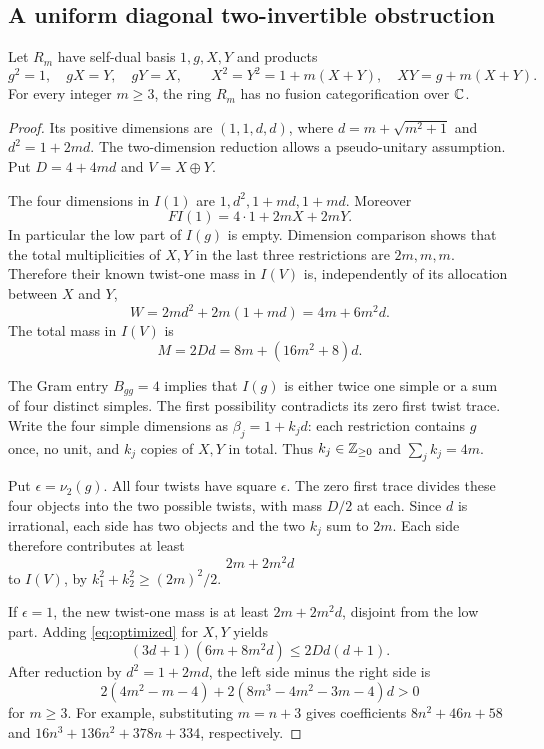 \subsection{A uniform diagonal two-invertible obstruction}
\begin{theorem}\label{thm:diagonal}
Let $R_m$ have self-dual basis $1,g,X,Y$ and products
\[
g^2=1,\quad gX=Y,\quad gY=X,\qquad
X^2=Y^2=1+m(X+Y),\quad XY=g+m(X+Y).
\]
For every integer $m\geq3$, the ring $R_m$ has no fusion categorification over $\mathbb C$.
\end{theorem}
\begin{proof}
Its positive dimensions are $(1,1,d,d)$, where $d=m+\sqrt{m^2+1}$ and $d^2=1+2md$. The two-dimension reduction allows a pseudo-unitary assumption. Put $D=4+4md$ and $V=X\oplus Y$.

The four dimensions in $I(1)$ are $1,d^2,1+md,1+md$. Moreover
\[
FI(1)=4\cdot1+2mX+2mY.
\]
In particular the low part of $I(g)$ is empty. Dimension comparison shows that the total multiplicities of $X,Y$ in the last three restrictions are $2m,m,m$. Therefore their known twist-one mass in $I(V)$ is, independently of its allocation between $X$ and $Y$,
\begin{equation}\label{eq:diag-W}
W=2md^2+2m(1+md)=4m+6m^2d.
\end{equation}
The total mass in $I(V)$ is
\[
M=2Dd=8m+(16m^2+8)d.
\]

The Gram entry $B_{gg}=4$ implies that $I(g)$ is either twice one simple or a sum of four distinct simples. The first possibility contradicts its zero first twist trace. Write the four simple dimensions as $\beta_j=1+k_jd$: each restriction contains $g$ once, no unit, and $k_j$ copies of $X,Y$ in total. Thus $k_j\in\mathbb Z_{\geq0}$ and $\sum_jk_j=4m$.

Put $\epsilon=\nu_2(g)$. All four twists have square $\epsilon$. The zero first trace divides these four objects into the two possible twists, with mass $D/2$ at each. Since $d$ is irrational, each side has two objects and the two $k_j$ sum to $2m$. Each side therefore contributes at least
\[
2m+2m^2d
\]
to $I(V)$, by $k_1^2+k_2^2\geq(2m)^2/2$.

If $\epsilon=1$, the new twist-one mass is at least $2m+2m^2d$, disjoint from the low part. Adding \eqref{eq:optimized} for $X,Y$ yields
\[
(3d+1)(6m+8m^2d)\leq 2Dd(d+1).
\]
After reduction by $d^2=1+2md$, the left side minus the right side is
\[
2(4m^2-m-4)+2(8m^3-4m^2-3m-4)d>0
\]
for $m\geq3$. For example, substituting $m=n+3$ gives coefficients
$8n^2+46n+58$ and $16n^3+136n^2+378n+334$, respectively.


\end{proof}
